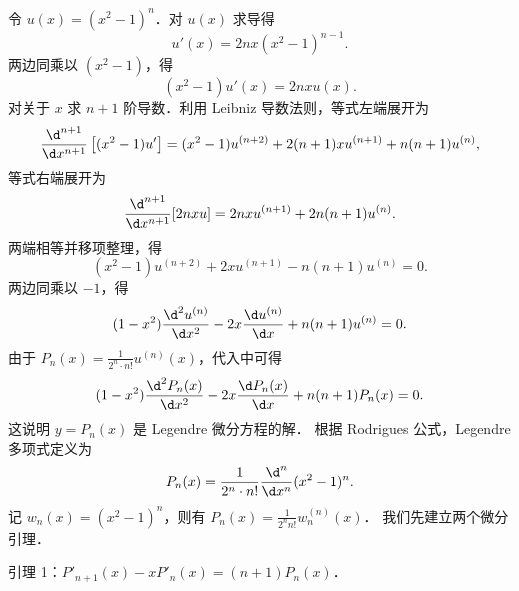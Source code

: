 \begin{myproof}
    令 $u(x) = (x^2 - 1)^n$．对 $u(x)$ 求导得
    \begin{equation}\label{eq:diff-u-8}
        u'(x) = 2nx(x^2 - 1)^{n-1}.
    \end{equation}
    两边同乘以 $(x^2 - 1)$，得
    \begin{equation}\label{eq:diff-eq-u-8}
        (x^2 - 1) u'(x) = 2nx u(x).
    \end{equation}
    对关于 $x$ 求 $n+1$ 阶导数．利用 Leibniz 导数法则，等式左端展开为
    \begin{equation}\label{eq:leibniz-lhs-8}
        \frac{\d^{n+1}}{\d x^{n+1}} \left[ (x^2 - 1) u' \right] = (x^2 - 1) u^{(n+2)} + 2(n+1)x u^{(n+1)} + n(n+1) u^{(n)},
    \end{equation}
    等式右端展开为
    \begin{equation}\label{eq:leibniz-rhs-8}
        \frac{\d^{n+1}}{\d x^{n+1}} [2nx u] = 2nx u^{(n+1)} + 2n(n+1) u^{(n)}.
    \end{equation}
    两端相等并移项整理，得
    \begin{equation}\label{eq:ode-simplify-8}
        (x^2 - 1) u^{(n+2)} + 2x u^{(n+1)} - n(n+1) u^{(n)} = 0.
    \end{equation}
    两边同乘以 $-1$，得
    \begin{equation}\label{eq:ode-final-8}
        (1 - x^2) \frac{\d^2 u^{(n)}}{\d x^2} - 2x \frac{\d u^{(n)}}{\d x} + n(n+1) u^{(n)} = 0.
    \end{equation}
    由于 $P_n(x) = \frac{1}{2^n \cdot n!} u^{(n)}(x)$，代入中可得
    \begin{equation}\label{eq:proof-final-8}
        (1 - x^2) \frac{\d^2 P_n(x)}{\d x^2} - 2x \frac{\d P_n(x)}{\d x} + n(n+1)P_n(x) = 0.
    \end{equation}
    这说明 $y = P_n(x)$ 是 Legendre 微分方程的解．
    根据 Rodrigues 公式，Legendre 多项式定义为
    \begin{equation}\label{eq:rodrigues-def-8}
        P_n(x) = \frac{1}{2^n \cdot n!} \frac{\d^n}{\d x^n} (x^2 - 1)^n.
    \end{equation}
    记 $w_n(x) = (x^2 - 1)^n$，则有 $P_n(x) = \frac{1}{2^n n!} w_n^{(n)}(x)$．
    我们先建立两个微分引理．

    引理 1：$P'_{n+1}(x) - x P'_n(x) = (n+1) P_n(x)$．


\end{myproof}

